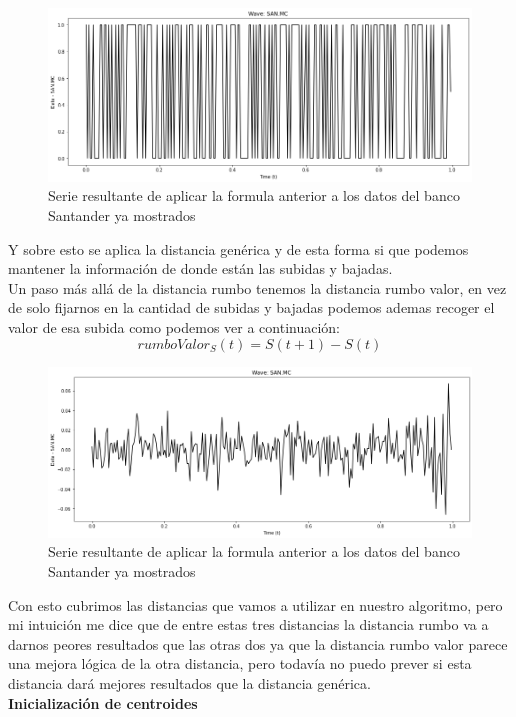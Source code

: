 \documentclass[12pt,a4paper]{article}
\begin{document}
\begin{figure}[H]
\centering
  \centering
  \includegraphics[width=1\linewidth]{course}
\caption{Serie resultante de aplicar la formula anterior a los datos del banco Santander ya mostrados}
\label{fig:test}
\end{figure}
			Y sobre esto se aplica la distancia genérica y de esta forma si que podemos mantener la información de donde están las subidas y bajadas.\\
			Un paso más allá de la distancia rumbo tenemos la distancia rumbo valor, en vez de solo fijarnos en la cantidad de subidas y bajadas podemos ademas recoger el valor de esa subida como podemos ver a continuación:\\
			\[rumboValor_S(t)= S(t+1) - S(t)\]
\begin{figure}[H]
\centering
  \centering
  \includegraphics[width=1\linewidth]{course value}
\caption{Serie resultante de aplicar la formula anterior a los datos del banco Santander ya mostrados}
\label{fig:test}
\end{figure}
			Con esto cubrimos las distancias que vamos a utilizar en nuestro algoritmo, pero mi intuición me dice que de entre estas tres distancias la distancia rumbo va a darnos peores resultados que las otras dos ya que la distancia rumbo valor parece una mejora lógica de la otra distancia, pero todavía no puedo prever si esta distancia dará mejores resultados que la distancia genérica.\\
			\textbf{Inicialización de centroides}\\
\end{document}
